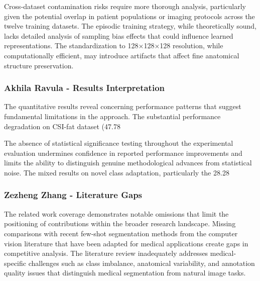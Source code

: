 Cross-dataset contamination risks require more thorough analysis, particularly given the potential overlap in patient populations or imaging protocols across the twelve training datasets. The episodic training strategy, while theoretically sound, lacks detailed analysis of sampling bias effects that could influence learned representations. The standardization to 128×128×128 resolution, while computationally efficient, may introduce artifacts that affect fine anatomical structure preservation.

\subsubsection{Akhila Ravula - Results Interpretation}
The quantitative results reveal concerning performance patterns that suggest fundamental limitations in the approach. The substantial performance degradation on CSI-fat dataset (47.78%

The absence of statistical significance testing throughout the experimental evaluation undermines confidence in reported performance improvements and limits the ability to distinguish genuine methodological advances from statistical noise. The mixed results on novel class adaptation, particularly the 28.28%

\subsubsection{Zezheng Zhang - Literature Gaps}
The related work coverage demonstrates notable omissions that limit the positioning of contributions within the broader research landscape. Missing comparisons with recent few-shot segmentation methods from the computer vision literature that have been adapted for medical applications create gaps in competitive analysis. The literature review inadequately addresses medical-specific challenges such as class imbalance, anatomical variability, and annotation quality issues that distinguish medical segmentation from natural image tasks.


